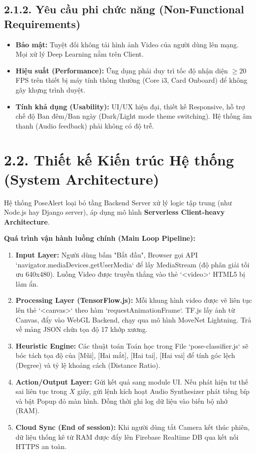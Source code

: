 \documentclass[12pt,a4paper]{report}
\begin{document}
\subsection{2.1.2. Yêu cầu phi chức năng (Non-Functional Requirements)}
\begin{itemize}
    \item \textbf{Bảo mật:} Tuyệt đối không tải hình ảnh Video của người dùng lên mạng. Mọi xử lý Deep Learning nằm trên Client.
    \item \textbf{Hiệu suất (Performance):} Ứng dụng phải duy trì tốc độ nhận diện $\ge 20$ FPS trên thiết bị máy tính thông thường (Core i3, Card Onboard) để không gây khựng trình duyệt.
    \item \textbf{Tính khả dụng (Usability):} UI/UX hiện đại, thiết kế Responsive, hỗ trợ chế độ Ban đêm/Ban ngày (Dark/Light mode theme switching). Hệ thống âm thanh (Audio feedback) phải không có độ trễ.
\end{itemize}

\section{2.2. Thiết kế Kiến trúc Hệ thống (System Architecture)}
Hệ thống PoseAlert loại bỏ tầng Backend Server xử lý logic tập trung (như Node.js hay Django server), áp dụng mô hình \textbf{Serverless Client-heavy Architecture}.


\textbf{Quá trình vận hành luồng chính (Main Loop Pipeline):}
\begin{enumerate}
    \item \textbf{Input Layer:} Người dùng bấm "Bắt đầu", Browser gọi API `navigator.mediaDevices.getUserMedia` để lấy MediaStream (độ phân giải tối ưu 640x480). Luồng Video được truyền thẳng vào thẻ `<video>` HTML5 bị làm ẩn.
    \item \textbf{Processing Layer (TensorFlow.js):} Mỗi khung hình video được vẽ liên tục lên thẻ `<canvas>` theo hàm `requestAnimationFrame`. TF.js lấy ảnh từ Canvas, đẩy vào WebGL Backend, chạy qua mô hình MoveNet Lightning. Trả về mảng JSON chứa tọa độ 17 khớp xương.
    \item \textbf{Heuristic Engine:} Các thuật toán Toán học trong File `pose-classifier.js` sẽ bóc tách tọa độ của [Mũi], [Hai mắt], [Hai tai], [Hai vai] để tính góc lệch (Degree) và tỷ lệ khoảng cách (Distance Ratio).
    \item \textbf{Action/Output Layer:} Gửi kết quả sang module UI. Nếu phát hiện tư thế sai liên tục trong $X$ giây, gửi lệnh kích hoạt Audio Synthesizer phát tiếng bíp và bật Popup đỏ màn hình. Đồng thời ghi log dữ liệu vào biến bộ nhớ (RAM).
    \item \textbf{Cloud Sync (End of session):} Khi người dùng tắt Camera kết thúc phiên, dữ liệu thống kê từ RAM được đẩy lên Firebase Realtime DB qua kết nối HTTPS an toàn.
\end{enumerate}
\end{document}

